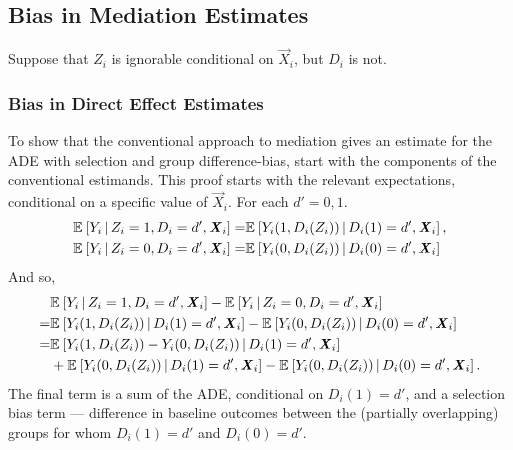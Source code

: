 
% 
%

\subsection{Bias in Mediation Estimates}
\label{appendix:mediation-bias}
Suppose that $Z_i$ is ignorable conditional on $\vec X_i$, but $D_i$ is not.

\subsubsection{Bias in Direct Effect Estimates}
To show that the conventional approach to mediation gives an estimate for the ADE with selection and group difference-bias, start with the components of the conventional estimands.
This proof starts with the relevant expectations, conditional on a specific value of $\vec X_i$.
For each $d' =0, 1$.
\begin{align*}
    \mathbb{E}_{} \left[ Y_i \, \middle\vert \, Z_i = 1, D_i = d', \boldsymbol{\mathit{X}}_i \right]
    =& \mathbb{E}_{} \left[ Y_i(1, D_i(Z_i)) \, \middle\vert \, D_i(1) = d', \boldsymbol{\mathit{X}}_i \right], \\
    \mathbb{E}_{} \left[ Y_i \, \middle\vert \, Z_i = 0, D_i = d', \boldsymbol{\mathit{X}}_i \right]
    =& \mathbb{E}_{} \left[ Y_i(0, D_i(Z_i)) \, \middle\vert \, D_i(0) = d', \boldsymbol{\mathit{X}}_i \right]
\end{align*}
And so,
\begin{align*}
    &  \mathbb{E}_{} \left[ Y_i \, \middle\vert \, Z_i = 1, D_i = d', \boldsymbol{\mathit{X}}_i \right]
    - \mathbb{E}_{} \left[ Y_i \, \middle\vert \, Z_i = 0, D_i = d', \boldsymbol{\mathit{X}}_i \right] \\
    =& \mathbb{E}_{} \left[ Y_i(1, D_i(Z_i)) \, \middle\vert \, D_i(1) = d', \boldsymbol{\mathit{X}}_i \right]
    - \mathbb{E}_{} \left[ Y_i(0, D_i(Z_i)) \, \middle\vert \, D_i(0) = d', \boldsymbol{\mathit{X}}_i \right] \\
    =& \mathbb{E}_{} \left[ Y_i(1, D_i(Z_i)) - Y_i(0, D_i(Z_i)) \, \middle\vert \, D_i(1) = d', \boldsymbol{\mathit{X}}_i \right] \\
    &+ \mathbb{E}_{} \left[ Y_i(0, D_i(Z_i)) \, \middle\vert \, D_i(1) = d', \boldsymbol{\mathit{X}}_i \right]
        - \mathbb{E}_{} \left[ Y_i(0, D_i(Z_i)) \, \middle\vert \, D_i(0) = d', \boldsymbol{\mathit{X}}_i \right].
\end{align*}
The final term is a sum of the ADE, conditional on $D_i(1) = d'$, and a selection bias term --- difference in baseline outcomes between the (partially overlapping) groups for whom $D_i(1) = d'$ and $D_i(0) = d'$.

